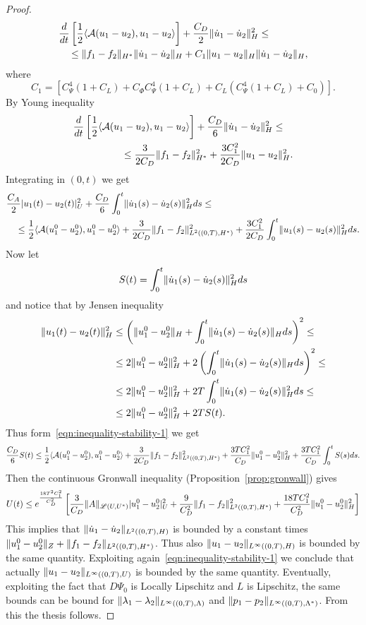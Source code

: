 \documentclass[a4paper,10pt,twoside]{amsbook}
\numberwithin{section}{chapter}
\numberwithin{equation}{chapter}
\theoremstyle{definition}
\DeclarePairedDelimiter{\norm}{\lVert}{\rVert}
\DeclarePairedDelimiter{\dual}{\langle}{\rangle}
\begin{document}
\begin{proof}
\[
\begin{multlined}
\frac{d}{dt}\left[\frac{1}{2}\dual{\mathcal{A}(u_1-u_2),u_1-u_2}\right]+\frac{C_D}{2}\norm{\dot u_1-\dot u_2}_H^2\le\\
\le\norm{f_1-f_2}_{H^*}\norm{\dot u_1-\dot u_2}_H+C_1\norm{u_1-u_2}_H\norm{\dot u_1-\dot u_2}_H,
\end{multlined}
\]
where
\[
C_1=\left[C_\Psi^4(1+C_L)+C_\Phi C_\Psi^4(1+C_L)+C_L(C_\Psi^4(1+C_L)+C_0)\right].
\]
By Young inequality
\[
\begin{multlined}
\frac{d}{dt}\left[\frac{1}{2}\dual{\mathcal{A}(u_1-u_2),u_1-u_2}\right]+\frac{C_D}{6}\norm{\dot u_1-\dot u_2}_H^2\le\\
\le\frac{3}{2C_D}\norm{f_1-f_2}_{H^*}^2+\frac{3C_1^2}{2C_D}\norm{u_1-u_2}_H^2.
\end{multlined}
\]
Integrating in $(0,t)$ we get
\begin{equation}
\label{eqn:inequality-stability-1}
\begin{multlined}
\frac{C_A}{2}|u_1(t)-u_2(t)|_U^2+\frac{C_D}{6}\int_0^t\norm{\dot u_1(s)-\dot u_2(s)}_H^2ds\le\\
\le\frac{1}{2}\dual{\mathcal{A}(u_1^0-u_2^0),u_1^0-u_2^0}+\frac{3}{2C_D}\norm{f_1-f_2}_{L^2((0,T),H^*)}^2+\frac{3C_1^2}{2C_D}\int_0^t\norm{u_1(s)-u_2(s)}_H^2ds.
\end{multlined}
\end{equation}
Now let
\[
S(t)=\int_0^t\norm{\dot u_1(s)-\dot u_2(s)}_H^2ds
\]
and notice that by Jensen inequality
\[
\begin{split}
\norm{u_1(t)-u_2(t)}_H^2&\le\left(\norm{u_1^0-u_2^0}_H+\int_0^t\norm{\dot u_1(s)-\dot u_2(s)}_Hds\right)^2\le\\
&\le2\norm{u_1^0-u_2^0}_H^2+2\left(\int_0^t\norm{\dot u_1(s)-\dot u_2(s)}_Hds\right)^2\le\\
&\le2\norm{u_1^0-u_2^0}_H^2+2T\int_0^t\norm{\dot u_1(s)-\dot u_2(s)}_H^2ds\le\\
&\le2\norm{u_1^0-u_2^0}_H^2+2TS(t).
\end{split}
\]
Thus form~\eqref{eqn:inequality-stability-1} we get
\[
\frac{C_D}{6}S(t)\le\frac{1}{2}\dual{\mathcal{A}(u_1^0-u_2^0),u_1^0-u_2^0}+\frac{3}{2C_D}\norm{f_1-f_2}_{L^2((0,T),H^*)}^2+\frac{3TC_1^2}{C_D}\norm{u_1^0-u_2^0}_H^2+\frac{3TC_1^2}{C_D}\int_0^tS(s)ds.
\]
Then the continuous Gronwall inequality (Proposition~\ref{prop:gronwall}) gives
\[
U(t)\le e^{\frac{18T^2C_1^2}{C_D^2}}\left[\frac{3}{C_D}\|A\|_{\mathscr{L}(U,U^*)}|u_1^0-u_2^0|_U^2+\frac{9}{C_D^2}\|f_1-f_2\|_{L^2((0,T),H^*)}^2+\frac{18TC_1^2}{C_D^2}\norm{u_1^0-u_2^0}_H^2\right]
\]
This implies that $\norm{\dot u_1-\dot u_2}_{L^2((0,T),H)}$ is bounded by a constant times $\norm{u_1^0-u_2^0}_Z+\norm{f_1-f_2}_{L^2((0,T),H^*)}$. Thus also $\norm{u_1-u_2}_{L^\infty((0,T),H)}$ is bounded by the same quantity. Exploiting again~\eqref{eqn:inequality-stability-1} we conclude that actually $\norm{u_1-u_2}_{L^\infty((0,T),U)}$ is bounded by the same quantity. Eventually, exploiting the fact that $D\Psi_0$ is Locally Lipschitz and $L$ is Lipschitz, the same bounds can be bound for $\norm{\lambda_1-\lambda_2}_{L^\infty((0,T),\Lambda)}$ and $\norm{p_1-p_2}_{L^\infty((0,T),\Lambda^*)}$. From this the thesis follows.
\end{proof}
\end{document}
